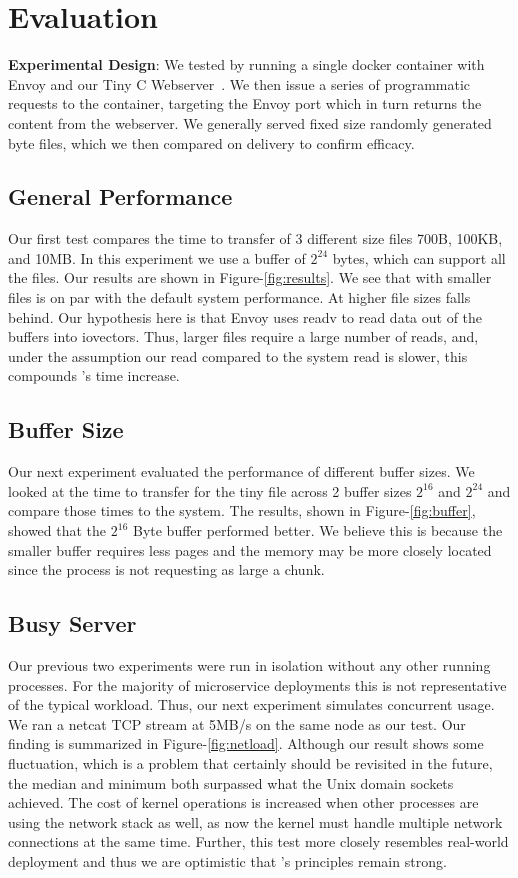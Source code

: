 \section{Evaluation}
\label{sec:evaluation}
\textbf{Experimental Design}:
We tested \sysname by running a single docker container with Envoy and our Tiny C Webserver~\cite{tiny}.
We then issue a series of programmatic requests to the container, targeting the Envoy port which in turn returns the content from the webserver.
We generally served fixed size randomly generated byte files, which we then compared on delivery to confirm efficacy.

\subsection{General Performance}
Our first test compares the time to transfer of 3 different size files 700B, 100KB, and 10MB.
In this experiment we use a buffer of $2^{24}$ bytes, which can support all the files.
Our results are shown in Figure-\ref{fig:results}.
We see that with smaller files \sysname is on par with the default system performance.
At higher file sizes \sysname falls behind.
Our hypothesis here is that Envoy uses readv to read data out of the buffers into iovectors.
Thus, larger files require a large number of reads, and, under the assumption our read compared to the system read is slower, this compounds \sysname's time increase.

\subsection{Buffer Size}
Our next experiment evaluated the performance of different buffer sizes.
We looked at the time to transfer for the tiny file across 2 buffer sizes $2^{16}$ and $2^{24}$ and compare those times to the system.
The results, shown in Figure-\ref{fig:buffer}, showed that the $2^{16}$ Byte buffer performed better.
We believe this is because the smaller buffer requires less pages and the memory may be more closely located since the process is not requesting as large a chunk.

\subsection{Busy Server}
Our previous two experiments were run in isolation without any other running processes.
For the majority of microservice deployments this is not representative of the typical workload.
Thus, our next experiment simulates concurrent usage.
We ran a netcat TCP stream at 5MB/s on the same node as our \sysname test.
Our finding is summarized in Figure-\ref{fig:netload}. Although our result shows some fluctuation, which is a problem that certainly should be revisited in the future, the median and minimum both surpassed what the Unix domain sockets achieved.
The cost of kernel operations is increased when other processes are using the network stack as well, as now the kernel must handle multiple network connections at the same time.
Further, this test more closely resembles real-world deployment and thus we are optimistic that \sysname's principles remain strong.

